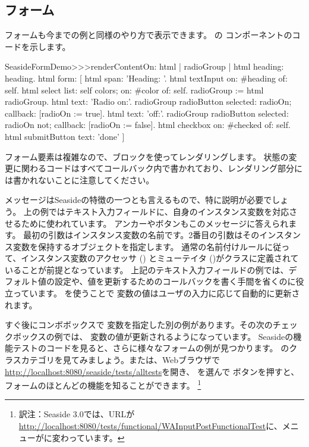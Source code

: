 \documentclass[a4paper,10pt,twoside]{book}
\begin{document}

\subsection{フォーム}

フォームも今までの例と同様のやり方で表示できます。
の コンポーネントのコードを示します。

\begin{code}{}
SeasideFormDemo>>>renderContentOn: html
	| radioGroup |
	html heading: heading.
	html form: [
		html span: 'Heading: '.
		html textInput on: #heading of: self.
		html select
			list: self colors;
			on: #color of: self.
		radioGroup := html radioGroup.
		html text: 'Radio on:'.
		radioGroup radioButton
			selected: radioOn;
			callback: [radioOn := true].
		html text: 'off:'.
		radioGroup radioButton
			selected: radioOn not;
			callback: [radioOn := false].
		html checkbox on: #checked of: self.
		html submitButton
			text: 'done' ]
\end{code}{}

フォーム要素は複雑なので、ブロックを使ってレンダリングします。
状態の変更に関わるコードはすべてコールバック内で書かれており、レンダリング部分には書かれないことに注意してください。

メッセージはSeasideの特徴の一つとも言えるもので、特に説明が必要でしょう。
上の例ではテキスト入力フィールドに、自身のインスタンス変数を対応させるために使われています。
アンカーやボタンもこのメッセージに答えられます。
最初の引数はインスタンス変数の名前です。2番目の引数はそのインスタンス変数を保持するオブジェクトを指定します。
通常の名前付けルールに従って、インスタンス変数のアクセッサ () とミューテイタ ()がクラスに定義されていることが前提となっています。
上記のテキスト入力フィールドの例では、デフォルト値の設定や、値を更新するためのコールバックを書く手間を省くのに役立っています。
を使うことで  変数の値はユーザの入力に応じて自動的に更新されます。

すぐ後にコンボボックスで 変数を指定した別の例があります。その次のチェックボックスの例では、  変数の値が更新されるようになっています。
Seasideの機能テストのコードを見ると、さらに様々なフォームの例が見つかります。
のクラスカテゴリを見てみましょう。または、Webブラウザで\url{http://localhost:8080/seaside/tests/alltests}を開き、
 を選んで  ボタンを押すと、フォームのほとんどの機能を知ることができます。
\footnote{訳注：Seaside 3.0では、URLが\url{http://localhost:8080/tests/functional/WAInputPostFunctionalTest}に、メニューがに変わっています。}
\end{document}
